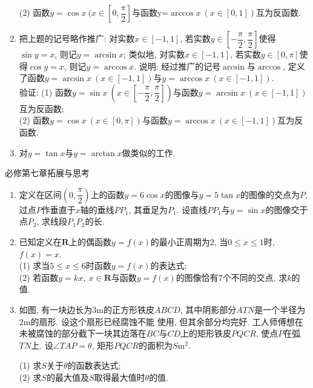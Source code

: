 \documentclass[10pt,a4paper]{article}
\begin{document}
\begin{enumerate}[1.]
(2) 函数$y=\cos x \ (x\in [0, \dfrac \pi 2]$与函数y=$\arccos x\ (x\in [0, 1])$互为反函数.
\item 把上题的记号略作推广: 对实数$x\in [-1, 1]$, 若实数$y\in [-\dfrac \pi 2, \dfrac\pi 2]$使得$\sin y=x$, 则记$y=\arcsin x$; 类似地, 对实数$x\in [-1, 1]$, 若实数$y\in [0, \pi]$使得$\cos y=x$, 则记$y=\arccos x$. 说明: 经过推广的记号$\arcsin$与$\arccos$, 定义了函数$y=\arcsin x \ (x\in [-1, 1])$与$y=\arccos x \ (x\in [-1, 1])$.\\
验证:
(1) 函数$y=\sin x \ (x\in  [-\dfrac\pi 2, \dfrac\pi 2])$与函数$y=\arcsin x \ (x\in [-1, 1])$互为反函数;\\
(2) 函数$y=\cos x\ (x\in [0, \pi])$与函数$y=\arccos x \ (x\in [-1, 1])$互为反函数.
\item 对$y=\tan x$与$y=\arctan x$做类似的工作.
\end{enumerate}

必修第七章拓展与思考
\begin{enumerate}[1.]
\item 定义在区间$(0, \dfrac\pi 2)$上的函数$y=6\cos x$的图像与$y=5\tan x$的图像的交点为$P$, 过点$P$作垂直于$x$轴的垂线$PP_1$, 其垂足为$P_1$. 设直线$PP_1$与$y=\sin x$的图像交于点$P_2$, 求线段$P_1P_2$的长.
\item 已知定义在$\mathbf{R}$上的偶函数$y=f(x)$的最小正周期为$2$, 当$0\le x\le 1$时, $f(x)=x$.\\
(1) 求当$5\le x\le 6$时函数$y=f(x)$的表达式;\\
(2) 若函数$y=kx,\ x\in \mathbf{R}$与函数$y=f(x)$的图像恰有$7$个不同的交点, 求$k$的值.
\item 如图, 有一块边长为$3\text{m}$的正方形铁皮$ABCD$, 其中阴影部分$ATN$是一个半径为$2\text{m}$的扇形. 设这个扇形已经腐蚀不能
使用, 但其余部分均完好. 工人师傅想在未被腐蚀的部分截下一块其边落在$BC$与$CD$上的矩形铁皮$PQCR$, 使点$P$在弧$TN$上. 设$\angle TAP=\theta$, 矩形$PQCR$的面积为$S\text{m}^2$.
\begin{center}
\end{center}
(1) 求$S$关于$\theta$的函数表达式;\\
(2) 求$S$的最大值及$S$取得最大值时$\theta$的值. 
\end{enumerate}
\end{document}
